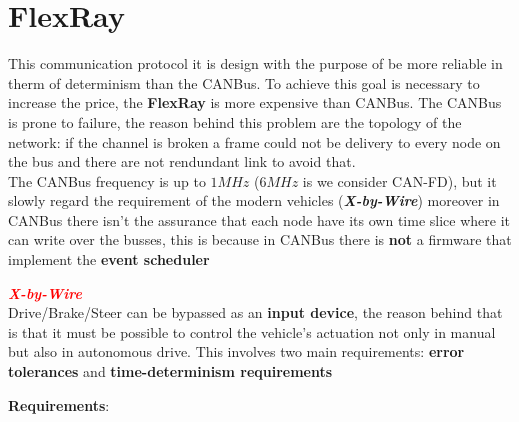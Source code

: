 \newpage
\section{FlexRay}
This communication protocol it is design with the purpose of be more reliable in therm of determinism than the CANBus. To achieve this goal is necessary to increase the price, the \textbf{FlexRay} is more expensive than CANBus. The CANBus is prone to failure, the reason behind this problem are the topology of the network: if the channel is broken a frame could not be delivery to every node on the bus and there are not rendundant link to avoid that. \\
The CANBus frequency is up to $1MHz$ ($6MHz$ is we consider CAN-FD), but it slowly regard the requirement of the modern vehicles (\textbf{\textit{X-by-Wire}}) moreover in CANBus there isn't the assurance that each node have its own time slice where it can write over the busses, this is because in CANBus there is \textbf{not} a firmware that implement the \textbf{event scheduler} 
\begin{boxA}
    \textcolor{red}{\textbf{\textit{X-by-Wire}}} \\
    Drive/Brake/Steer can be bypassed as an \textbf{input device}, the reason behind that is that it must be possible to control the vehicle's actuation not only in manual but also in autonomous drive. This involves two main requirements: \textbf{error tolerances} and \textbf{time-determinism requirements}
\end{boxA}
\textbf{Requirements}:
